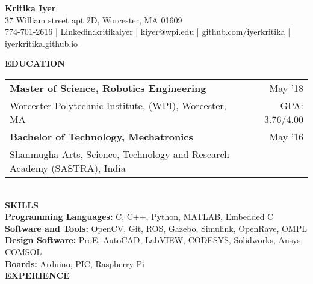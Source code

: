 \documentclass[10pt,a4paper]{article}
\begin{document}
\begin{center}

\textbf{\Large{Kritika Iyer}}\\
37 William street apt 2D, Worcester, MA 01609\\
774-701-2616 | Linkedin:kritikaiyer | kiyer@wpi.edu | github.com/iyerkritika | iyerkritika.github.io\\
\end{center}
\textbf{EDUCATION}\\
\begin{tabular}{p{} r}
\textbf{Master of Science, Robotics Engineering} & May '18 \\
Worcester Polytechnic Institute, (WPI), Worcester, MA & GPA: 3.76/4.00 \\[1ex]
\textbf{Bachelor of Technology, Mechatronics} & May '16 \\
Shanmugha Arts, Science, Technology  and Research Academy (SASTRA), India
\end{tabular}
\\[1\baselineskip]
\textbf{SKILLS}\\
\textbf{Programming Languages:} C, C++, Python, MATLAB, Embedded C\\
\textbf{Software and Tools:} OpenCV, Git, ROS, Gazebo, Simulink, OpenRave, OMPL \\
\textbf{Design Software:} ProE, AutoCAD, LabVIEW, CODESYS, Solidworks, Ansys, COMSOL\\
\textbf{Boards:} Arduino, PIC, Raspberry Pi\\
[1\baselineskip]
\textbf{EXPERIENCE}\\
\end{document}
